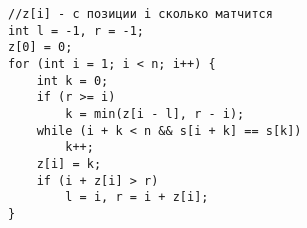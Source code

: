 \begin{verbatim}
//z[i] - с позиции i сколько матчится
int l = -1, r = -1;
z[0] = 0;
for (int i = 1; i < n; i++) {
	int k = 0;
	if (r >= i)
		k = min(z[i - l], r - i);
	while (i + k < n && s[i + k] == s[k])
		k++;
	z[i] = k;
	if (i + z[i] > r)
		l = i, r = i + z[i];
}
\end{verbatim}
